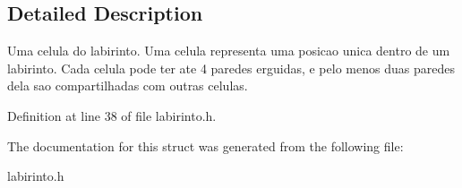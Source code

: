 \subsection{Detailed Description}
Uma celula do labirinto. Uma celula representa uma posicao unica dentro de um labirinto. Cada celula pode ter ate 4 paredes erguidas, e pelo menos duas paredes dela sao compartilhadas com outras celulas. 

Definition at line 38 of file labirinto.\+h.



The documentation for this struct was generated from the following file\+:\begin{DoxyCompactItemize}
\item 
labirinto.\+h\end{DoxyCompactItemize}
